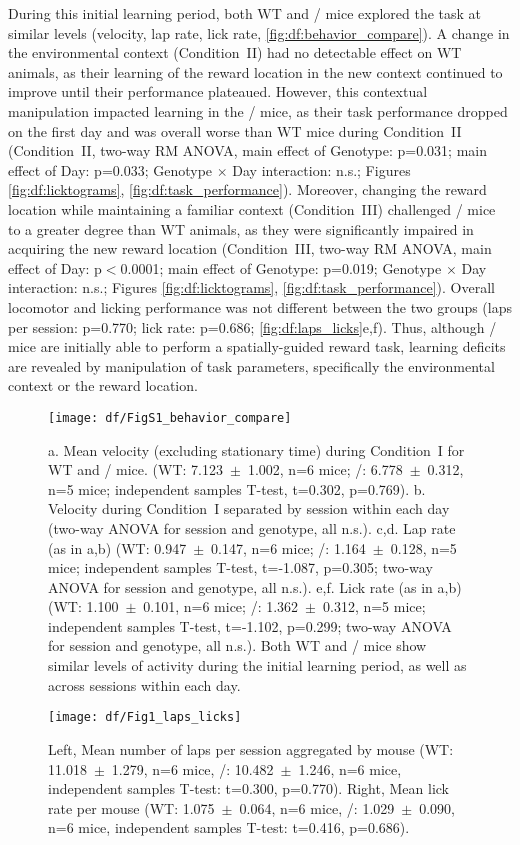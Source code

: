 During this initial learning period, both WT and \df/ mice explored the task at similar levels (velocity, lap rate, lick rate, \autoref{fig:df:behavior_compare}). A change in the environmental context (Condition~II) had no detectable effect on WT animals, as their learning of the reward location in the new context continued to improve until their performance plateaued. However, this contextual manipulation impacted learning in the \df/ mice, as their task performance dropped on the first day and was overall worse than WT mice during Condition~II (Condition~II, two-way RM ANOVA, main effect of Genotype: p=0.031; main effect of Day: p=0.033; Genotype $\times$ Day interaction: n.s.; Figures \ref{fig:df:licktograms}, \ref{fig:df:task_performance}). Moreover, changing the reward location while maintaining a familiar context (Condition~III) challenged \df/ mice to a greater degree than WT animals, as they were significantly impaired in acquiring the new reward location (Condition~III, two-way RM ANOVA, main effect of Day: p$<$0.0001; main effect of Genotype: p=0.019; Genotype $\times$ Day interaction: n.s.; Figures \ref{fig:df:licktograms}, \ref{fig:df:task_performance}). Overall locomotor and licking performance was not different between the two groups (laps per session: p=0.770; lick rate: p=0.686; \autoref{fig:df:laps_licks}e,f). Thus, although \df/ mice are initially able to perform a spatially-guided reward task, learning deficits are revealed by manipulation of task parameters, specifically the environmental context or the reward location.
\begin{figure}
	\centering
	\texttt{[image: df/FigS1\_behavior\_compare]}
	\caption[Comparison of behavior during initial learning in GOL]{a. Mean velocity (excluding stationary time) during Condition~I for WT and \df/ mice. (WT: 7.123~$\pm$~1.002, n=6 mice; \df/: 6.778~$\pm$~0.312, n=5 mice; independent samples T-test, t=0.302, p=0.769). b. Velocity during Condition~I separated by session within each day (two-way ANOVA for session and genotype, all n.s.). c,d. Lap rate (as in a,b) (WT: 0.947~$\pm$~0.147, n=6 mice; \df/: 1.164~$\pm$~0.128, n=5 mice; independent samples T-test, t=-1.087, p=0.305; two-way ANOVA for session and genotype, all n.s.). e,f. Lick rate (as in a,b) (WT: 1.100~$\pm$~0.101, n=6 mice; \df/: 1.362~$\pm$~0.312, n=5 mice; independent samples T-test, t=-1.102, p=0.299; two-way ANOVA for session and genotype, all n.s.). Both WT and \df/ mice show similar levels of activity during the initial learning period, as well as across sessions within each day.}
	\label{fig:df:behavior_compare}
\end{figure}
\begin{figure}
	\centering
	\texttt{[image: df/Fig1\_laps\_licks]}
	\caption[Laps and licks per session]{Left, Mean number of laps per session aggregated by mouse (WT: 11.018~$\pm$~1.279, n=6 mice, \df/: 10.482~$\pm$~1.246, n=6 mice, independent samples T-test: t=0.300, p=0.770).
	Right, Mean lick rate per mouse (WT: 1.075~$\pm$~0.064, n=6 mice, \df/: 1.029~$\pm$~0.090, n=6 mice, independent samples T-test: t=0.416, p=0.686).}
	\label{fig:df:laps_licks}
\end{figure}

